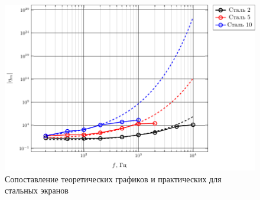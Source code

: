 \begin{figure}[H]
	\centering
	\includegraphics[scale=1]{imgs/graphs/eta_wt_steel}
	\caption{Сопоставление теоретических графиков и практических для стальных экранов}
	\label{fig:eta_wt_steel}
\end{figure}

% 


























 














































